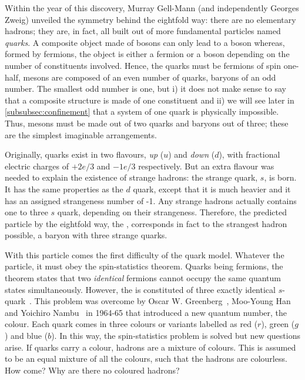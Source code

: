 Within the year of this discovery, Murray Gell-Mann (and independently Georges Zweig) unveiled the symmetry behind the eightfold way: there are no elementary hadrons; they are, in fact, all built out of more fundamental particles named \textit{quarks}. A composite object made of bosons can only lead to a boson whereas, formed by fermions, the object is either a fermion or a boson depending on the number of constituents involved. Hence, the quarks must be fermions of spin one-half, mesons are composed of an even number of quarks, baryons of an odd number. The smallest odd number is one, but i) it does not make sense to say that a composite structure is made of one constituent and ii) we will see later in \Sec\ref{subsubsec:confinement} that a system of one quark is physically impossible. Thus, mesons must be made out of two quarks and baryons out of three; these are the simplest imaginable arrangements. 

Originally, quarks exist in two flavours, \textit{up} ($u$) and \textit{down} ($d$), with fractional electric charges of $+2e/3$ and $-1e/3$ respectively. But an extra flavour was needed to explain the existence of strange hadrons: the strange quark, $s$, is born. It has the same properties as the $d$ quark, except that it is much heavier and it has an assigned strangeness number of -1. Any strange hadrons actually contains one to three $s$ quark, depending on their strangeness. Therefore, the predicted particle by the eightfold way, the \rmOmegaM, corresponds in fact to the strangest hadron possible, a baryon with three strange quarks.

With this particle comes the first difficulty of the quark model. Whatever the particle, it must obey the spin-statistics theorem. Quarks being fermions, the theorem states that two \textit{identical} fermions cannot occupy the same quantum states simultaneously. However, the \rmOmegaM is constituted of three exactly identical $s$-quark~\cite{skandsIntroductionQCD2013}. This problem was overcome by Oscar W. Greenberg~\cite{greenbergSpinUnitarySpinIndependence1964}, Moo-Young Han and Yoichiro Nambu~\cite{hanThreeTripletModelDouble1965} in 1964-65 that introduced a new quantum number, the colour. Each quark comes in three colours or variants labelled as red ($r$), green ($g$) and blue ($b$). In this way, the spin-statistics problem is solved but new questions arise. If quarks carry a colour, hadrons are a mixture of colours. This is assumed to be an equal mixture of all the colours, such that the hadrons are colourless. How come? Why are there no coloured hadrons?

